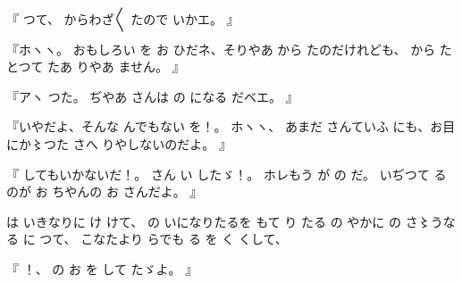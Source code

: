 『
つて、
からわざ〳〵
たので
いかエ。
』

『ホヽヽ。
おもしろい
を
お
ひだネ、そりやあ
から
たのだけれども、
から
たとつて
たあ
りやあ
ません。
』

『アヽ
つた。
ぢやあ
さんは
の
になる
だベエ。
』

『いやだよ、そんな
んでもない
を！。
ホヽヽ、
あまだ
さんていふ
にも、お目にか〻つた
さへ
りやしないのだよ。
』

『
してもいかないだ！。
さん
い
したゞ！。
ホレもう
が
の
だ。
いぢつて
るのが
お
ちやんの
お
さんだよ。
』

は
いきなりに
け
けて、
の
いになりたるを
もて
り
たる
の
やかに
の
さ〻うなる
に
つて、
こなたより
らでも
る
を
く
くして、

『
！、
の
お
を
して
たゞよ。
』

